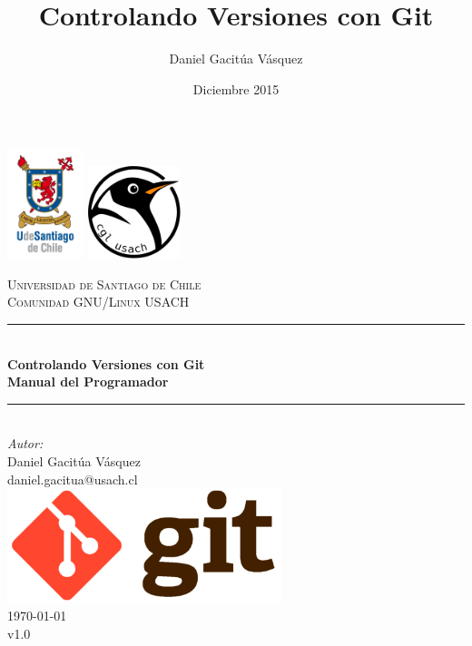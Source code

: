 \documentclass{article}
\title{Controlando Versiones con Git}
\author{Daniel Gacitúa Vásquez}
\date{Diciembre 2015}
\begin{document}
\begin{titlepage}

\newcommand{\HRule}{\rule{\linewidth}{0.5mm}}

\noindent
\includegraphics[height=3.2cm]{logos/logousach.png}
\hfill
\includegraphics[height=2.7cm]{logos/logocgl.png}

\center

\textsc{\LARGE Universidad de Santiago de Chile}\\[0.5cm]
\textsc{\Large Comunidad GNU/Linux USACH}\\[1.5cm]

\HRule \\[0.4cm]
{ \huge \bfseries Controlando Versiones con Git\\[0.4cm]
\LARGE Manual del Programador}\\[0.4cm]

\HRule \\[1.5cm]\Large \emph{Autor:}\\
Daniel Gacitúa Vásquez\\
daniel.gacitua@usach.cl\\[2cm]

\includegraphics[width=8cm]{logos/logogit.png}\\[1cm]

{\large \today\\
v1.0}\\[2cm]

\vfill

\end{titlepage}
\end{document}
